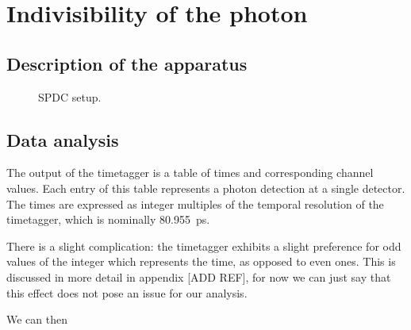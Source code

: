 \documentclass[main.tex]{subfiles}
\begin{document}
\section{Indivisibility of the photon}

\subsection{Description of the apparatus}

\begin{figure}[ht]
\centering

\caption{SPDC setup.}
\label{fig:spdc}
\end{figure}

\subsection{Data analysis}

The output of the timetagger is a table of times and corresponding channel values.
Each entry of this table represents a photon detection at a single detector.
The times are expressed as integer multiples of the temporal resolution of the timetagger, which is nominally \SI{80.955}{ps}.

There is a slight complication: the timetagger exhibits a slight preference for odd values of the integer which represents the time, as opposed to even ones. This is discussed in more detail in appendix [ADD REF], for now we can just say that this effect does not pose an issue for our analysis.

We can then 
\end{document}
